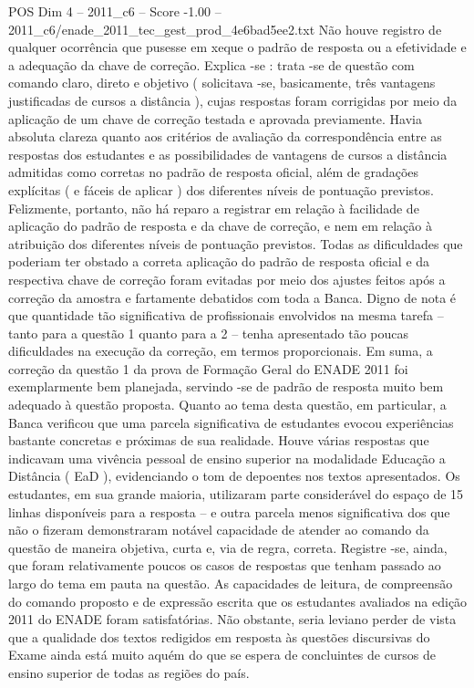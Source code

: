 \begin{textsample}{POS Dim 4 – 2011\_c6 – Score -1.00 – 2011\_c6/enade\_2011\_tec\_gest\_prod\_4e6bad5ee2.txt}
Não houve registro de qualquer ocorrência que pusesse em xeque o padrão de resposta ou a efetividade e a adequação da chave de correção.
Explica -se : trata -se de questão com comando claro, direto e objetivo ( solicitava -se, basicamente, três vantagens justificadas de cursos a distância ), cujas respostas foram corrigidas por meio da aplicação de um chave de correção testada e aprovada previamente.
Havia absoluta clareza quanto aos critérios de avaliação da correspondência entre as respostas dos estudantes e as possibilidades de vantagens de cursos a distância admitidas como corretas no padrão de resposta oficial, além de gradações explícitas ( e fáceis de aplicar ) dos diferentes níveis de pontuação previstos.
Felizmente, portanto, não há reparo a registrar em relação à facilidade de aplicação do padrão de resposta e da chave de correção, e nem em relação à atribuição dos diferentes níveis de pontuação previstos.
Todas as dificuldades que poderiam ter obstado a correta aplicação do padrão de resposta oficial e da respectiva chave de correção foram evitadas por meio dos ajustes feitos após a correção da amostra e fartamente debatidos com toda a Banca.
Digno de nota é que quantidade tão significativa de profissionais envolvidos na mesma tarefa – tanto para a questão 1 quanto para a 2 – tenha apresentado tão poucas dificuldades na execução da correção, em termos proporcionais.
Em suma, a correção da questão 1 da prova de Formação Geral do ENADE 2011 foi exemplarmente bem planejada, servindo -se de padrão de resposta muito bem adequado à questão proposta.
Quanto ao tema desta questão, em particular, a Banca verificou que uma parcela significativa de estudantes evocou experiências bastante concretas e próximas de sua realidade.
Houve várias respostas que indicavam uma vivência pessoal de ensino superior na modalidade Educação a Distância ( EaD ), evidenciando o tom de depoentes nos textos apresentados.
Os estudantes, em sua grande maioria, utilizaram parte considerável do espaço de 15 linhas disponíveis para a resposta – e outra parcela menos significativa dos que não o fizeram demonstraram notável capacidade de atender ao comando da questão de maneira objetiva, curta e, via de regra, correta.
Registre -se, ainda, que foram relativamente poucos os casos de respostas que tenham passado ao largo do tema em pauta na questão.
As capacidades de leitura, de compreensão do comando proposto e de expressão escrita que os estudantes avaliados na edição 2011 do ENADE foram satisfatórias.
Não obstante, seria leviano perder de vista que a qualidade dos textos redigidos em resposta às questões discursivas do Exame ainda está muito aquém do que se espera de concluintes de cursos de ensino superior de todas as regiões do país.

\end{textsample}
